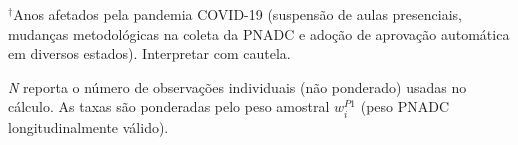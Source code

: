 \begin{table}[htbp]
\begin{threeparttable}
\begin{tablenotes}
\item $^{\dagger}$Anos afetados pela pandemia COVID-19 (suspensão de aulas presenciais, mudanças metodológicas na coleta da PNADC e adoção de aprovação automática em diversos estados). Interpretar com cautela.
\item \emph{N} reporta o número de observações individuais (não ponderado) usadas no cálculo. As taxas são ponderadas pelo peso amostral $w_i^{P1}$ (peso PNADC longitudinalmente válido).
\end{tablenotes}
\end{threeparttable}
\end{table}
